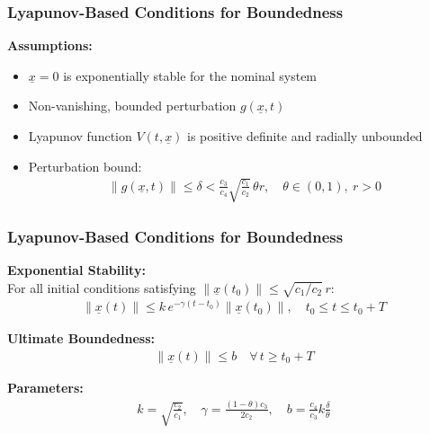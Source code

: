 \documentclass[student, noshadow, lsr, english, aspectratio=169, t]{ITR_LSR_slides}
\begin{document}
\begin{frame}
	\frametitle{Lyapunov-Based Conditions for Boundedness}

	\textbf{Assumptions:}
	\begin{itemize}
		\item $\underline{x} = 0$ is exponentially stable for the nominal system
		\item Non-vanishing, bounded perturbation $g(\underline{x}, t)$
		\item Lyapunov function $V(t, \underline{x})$ is positive definite and radially unbounded
		\item Perturbation bound:
		\begin{align*}
			\|g(\underline{x}, t)\| \leq \delta < \frac{c_3}{c_4} \sqrt{\frac{c_1}{c_2}}\, \theta r, \quad \theta \in (0,1),\ r > 0
		\end{align*}
	\end{itemize}
\end{frame}


\begin{frame}
	\frametitle{Lyapunov-Based Conditions for Boundedness}

	\textbf{Exponential Stability:} \\
	For all initial conditions satisfying $\|\underline{x}(t_0)\| \leq \sqrt{c_1/c_2} \, r$:
	\begin{align*}
		\|\underline{x}(t)\| \leq k\, e^{-\gamma (t - t_0)} \|\underline{x}(t_0)\|, \quad t_0 \leq t \leq t_0 + T
	\end{align*}

	\textbf{Ultimate Boundedness:}
	\begin{align*}
		\|\underline{x}(t)\| \leq b \quad \forall\, t \geq t_0 + T
	\end{align*}

	\textbf{Parameters:}
	\begin{align*}
		k = \sqrt{\frac{c_2}{c_1}}, \quad \gamma = \frac{(1 - \theta)c_3}{2c_2}, \quad b = \frac{c_4}{c_3}k \frac{\delta}{\theta}
	\end{align*}
\end{frame}
\end{document}
